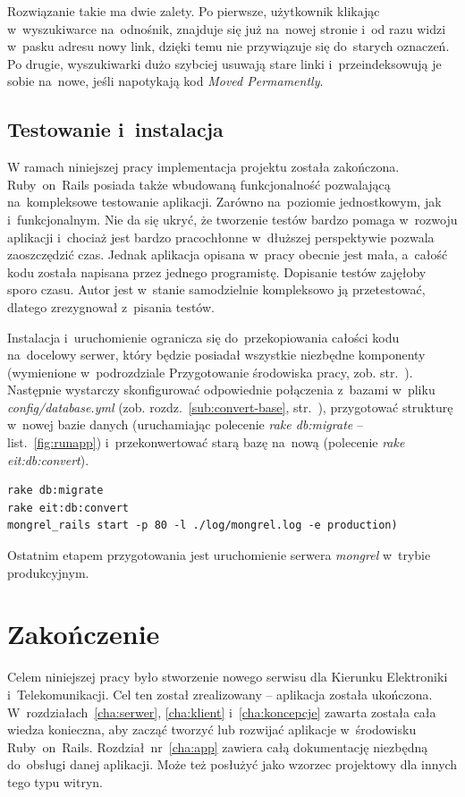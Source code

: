 \documentclass[a4paper,12pt,oneside]{report}
\begin{document}
Rozwiązanie takie ma dwie zalety. Po pierwsze, użytkownik klikając w~wyszukiwarce na~odnośnik, znajduje się już na~nowej stronie i~od razu widzi w~pasku adresu nowy link, dzięki temu nie przywiązuje się do~starych oznaczeń. Po drugie, wyszukiwarki dużo szybciej usuwają stare linki i~przeindeksowują je sobie na~nowe, jeśli napotykają kod \emph{Moved Permamently}.

\section{Testowanie i~instalacja}
\label{sec:testowanie}
W ramach niniejszej pracy implementacja projektu została zakończona. Ruby~on~Rails posiada także wbudowaną funkcjonalność pozwalającą na~kompleksowe testowanie aplikacji. Zarówno na~poziomie jednostkowym, jak i~funkcjonalnym. Nie da się ukryć, że tworzenie testów bardzo pomaga w~rozwoju aplikacji i~chociaż jest bardzo pracochłonne w~dłuższej perspektywie pozwala zaoszczędzić czas. Jednak aplikacja opisana w~pracy obecnie jest mała, a~całość kodu została napisana przez jednego programistę. Dopisanie testów zajęłoby sporo czasu. Autor jest w~stanie samodzielnie kompleksowo ją przetestować, dlatego zrezygnował z~pisania testów.

Instalacja i~uruchomienie ogranicza się do~przekopiowania całości kodu na~docelowy serwer, który będzie posiadał wszystkie niezbędne komponenty (wymienione w~podrozdziale Przygotowanie środowiska pracy, zob. str.~\pageref{sec:srodowisko}). Następnie wystarczy skonfigurować odpowiednie połączenia z~bazami w~pliku \emph{config/database.yml} (zob. rozdz.~\ref{sub:convert-base}, str.~\pageref{sub:convert-base}), przygotować strukturę w~nowej bazie danych (uruchamiając polecenie \emph{rake db:migrate} -- list.~\ref{fig:runapp}) i~przekonwertować starą bazę na~nową (polecenie \emph{rake eit:db:convert}).

\begin{lstlisting}[caption={Kompletny zestaw poleceń, niezbędny do~uruchomienia aplikacji},label=fig:runapp,captionpos=b]
rake db:migrate
rake eit:db:convert
mongrel_rails start -p 80 -l ./log/mongrel.log -e production)
\end{lstlisting}

Ostatnim etapem przygotowania jest uruchomienie serwera \emph{mongrel} w~trybie produkcyjnym.

\chapter{Zakończenie}
\label{cha:end}
Celem niniejszej pracy było stworzenie nowego serwisu dla Kierunku Elektroniki i~Telekomunikacji. Cel ten został zrealizowany -- aplikacja została ukończona. W~rozdziałach~\ref{cha:serwer}, \ref{cha:klient} i~\ref{cha:koncepcje} zawarta została cała wiedza konieczna, aby zacząć tworzyć lub rozwijać aplikacje w~środowisku Ruby~on~Rails. Rozdział~nr~\ref{cha:app} zawiera całą dokumentację niezbędną do~obsługi danej aplikacji. Może też posłużyć jako wzorzec projektowy dla innych tego typu witryn.
\end{document}
